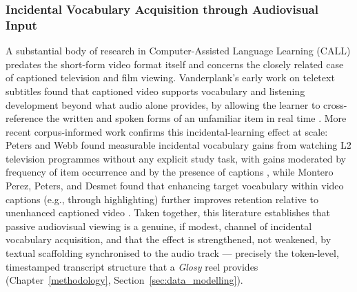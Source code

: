         \subsubsection{Incidental Vocabulary Acquisition through Audiovisual Input}
        A substantial body of research in Computer-Assisted Language Learning (CALL) predates the short-form video format itself and concerns the closely related case of captioned television and film viewing. Vanderplank's early work on teletext subtitles found that captioned video supports vocabulary and listening development beyond what audio alone provides, by allowing the learner to cross-reference the written and spoken forms of an unfamiliar item in real time \cite{vanderplank1988value}. More recent corpus-informed work confirms this incidental-learning effect at scale: Peters and Webb found measurable incidental vocabulary gains from watching L2 television programmes without any explicit study task, with gains moderated by frequency of item occurrence and by the presence of captions \cite{peters2018incidental}, while Montero Perez, Peters, and Desmet found that enhancing target vocabulary within video captions (e.g., through highlighting) further improves retention relative to unenhanced captioned video \cite{monteroperez2018vocabulary}. Taken together, this literature establishes that passive audiovisual viewing is a genuine, if modest, channel of incidental vocabulary acquisition, and that the effect is strengthened, not weakened, by textual scaffolding synchronised to the audio track --- precisely the token-level, timestamped transcript structure that a \textit{Glosy} reel provides (Chapter~\ref{methodology}, Section~\ref{sec:data_modelling}).

